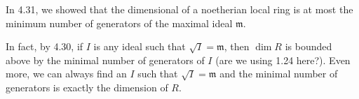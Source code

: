 In 4.31, we showed that the dimensional of a noetherian local ring is at most
the minimum number of generators of the maximal ideal $\mathfrak{m}$.

In fact, by 4.30, if $I$ is any ideal such that $\sqrt{I} = \mathfrak{m}$, then
$\dim R$ is bounded above by the minimal number of generators of $I$ (are we
using 1.24 here?). Even more, we can always find an $I$ such that $\sqrt{I} = \mathfrak{m}$
and the minimal number of generators is exactly the dimension of $R$.
